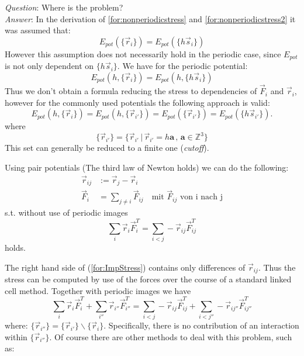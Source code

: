\emph{Question}: Where is the problem?\\
\emph{Answer}: In the derivation of \ref{for:nonperiodicstress} and \ref{for:nonperiodicstress2} it was assumed that:
\begin{equation}
  E_{pot}(\{\vec{r}_i\}) = E_{pot}(\{h\vec{s}_i\})
\end{equation}
However this assumption does not necessarily hold in the periodic case, since $E_{pot}$ is not only dependent on $\{h\vec{s}_i\}$. We have for the periodic potential:
\begin{equation}
  E_{pot}(h,\{\vec{r}_i\}) = E_{pot}(h,\{h\vec{s}_i\})
\end{equation}
Thus we don't obtain a formula reducing the stress to dependencies of \(\vec{F}_i\) and \(\vec{r}_i\), however for the commonly used potentials the following approach is valid:
\begin{equation}
  E_{pot}(h,\{\vec{r}_i\}) = E_{pot}(h,\{\vec{r}_{i'}\}) = E_{pot}(\{\vec{r}_{i'}\}) = E_{pot}(\{h\vec{s}_{i'}\})
  .
\end{equation}
where
\begin{equation}
  \{\vec{r}_{i'}\} = \{ \vec{r}_{i'} \,|\, \vec{r}_{i'}=h\mathbf{a}\, , \, \mathbf{a} \in \mathbb{Z}^3\}
\end{equation}
This set can generally be reduced to a finite one (\emph{cutoff}).

Using pair potentials (The third law of Newton holds) we can do the following:
\begin{equation*}
  \begin{split}
    \vec{r}_{ij} 
    & := \vec{r}_{j} - \vec{r}_{i} \\
    \vec{F}_{i} 
    & = \sum_{j \neq i} \vec{F}_{ij} \quad \textrm{mit \(\vec{F}_{ij}\) von i nach j} 
  \end{split}
\end{equation*}
s.t. without use of periodic images
\begin{equation}
  \label{for:ImpStress}
  \sum_i \vec{r}_i\vec{F}_i^T = \sum_{i<j} -\vec{r}_{ij}\vec{F}_{ij}^T
\end{equation}
holds.

The right hand side of (\ref{for:ImpStress}) contains only differences of \(\vec{r}_{ij}\). Thus the stress can be computed by use of the forces over the course of a standard linked cell method. Together with periodic images we have
\begin{equation}
  \sum_i \vec{r}_i\vec{F}_i^T+\sum_{i''} \vec{r}_{i''}\vec{F}_{i''}^T = \sum_{i<j} -\vec{r}_{ij}\vec{F}_{ij}^T + \sum_{i<j''} -\vec{r}_{ij''}\vec{F}_{ij''}^T
\end{equation}
where: $\{\vec{r}_{i''}\} = \{\vec{r}_{i'}\} \backslash \{\vec{r}_{i}\}$. Specifically, there is no contribution of an interaction within $\{\vec{r}_{i''}\}$.
Of course there are other methods to deal with this problem, such as:

